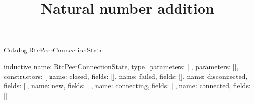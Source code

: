 \begin{lexlean}{Catalog.RtcPeerConnectionState}
\title{Natural number addition}
\begin{semanticmodule}
inductive{
  name: RtcPeerConnectionState,
  type_parameters: [],
  parameters: [],
  constructors: [
    {name: closed, fields: []},
    {name: failed, fields: []},
    {name: disconnected, fields: []},
    {name: new, fields: []},
    {name: connecting, fields: []},
    {name: connected, fields: []}
  ]
}
\end{semanticmodule}
\end{lexlean}
